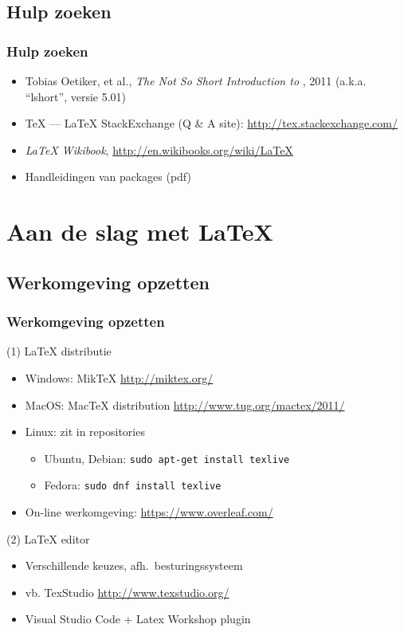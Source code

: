 \documentclass[aspectratio=169]{beamer}
\begin{document}
\subsection{Hulp zoeken}

\begin{frame}
  \frametitle{Hulp zoeken}

  \begin{itemize}
    \item Tobias Oetiker, et al., \emph{The Not So Short Introduction to {\LaTeXe}}, 2011 (a.k.a. ``lshort'', versie 5.01)
    \item {\TeX} --- {\LaTeX} StackExchange (Q \& A site): \url{http://tex.stackexchange.com/}
    \item \emph{{\LaTeX} Wikibook}, \url{http://en.wikibooks.org/wiki/LaTeX}
    \item Handleidingen van packages (pdf)
  \end{itemize}

\end{frame}

\section{Aan de slag met {\LaTeX}}

\subsection{Werkomgeving opzetten}

\begin{frame}
  \frametitle{Werkomgeving opzetten}

  (1) {\LaTeX} distributie

  \begin{itemize}
    \item Windows: MikTeX \url{http://miktex.org/}
    \item MacOS: MacTeX distribution \url{http://www.tug.org/mactex/2011/}
    \item Linux: zit in repositories
    \begin{itemize}
      \item Ubuntu, Debian: \texttt{sudo apt-get install texlive}
      \item Fedora: \texttt{sudo dnf install texlive}
    \end{itemize}
    \item On-line werkomgeving: \url{https://www.overleaf.com/}
  \end{itemize}

  (2) {\LaTeX} editor

  \begin{itemize}
    \item Verschillende keuzes, afh.~besturingssysteem
    \item vb. TexStudio \url{http://www.texstudio.org/}
    \item Visual Studio Code + Latex Workshop plugin
  \end{itemize}
\end{frame}
\end{document}
